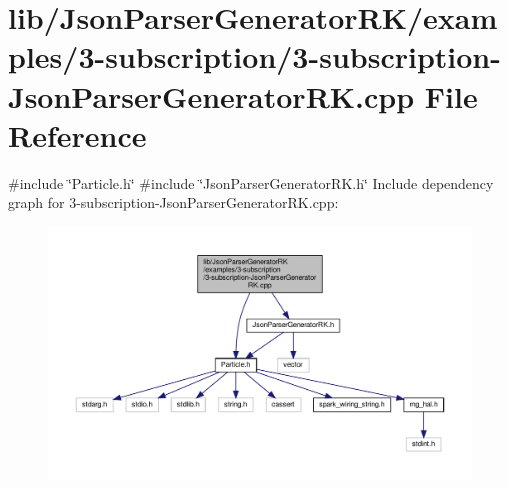 \hypertarget{3-subscription-_json_parser_generator_r_k_8cpp}{}\section{lib/\+Json\+Parser\+Generator\+R\+K/examples/3-\/subscription/3-\/subscription-\/\+Json\+Parser\+Generator\+RK.cpp File Reference}
\label{3-subscription-_json_parser_generator_r_k_8cpp}
{\ttfamily \#include \char`\"{}Particle.\+h\char`\"{}}\newline
{\ttfamily \#include \char`\"{}Json\+Parser\+Generator\+R\+K.\+h\char`\"{}}\newline
Include dependency graph for 3-\/subscription-\/\+Json\+Parser\+Generator\+RK.cpp\+:
\nopagebreak
\begin{figure}[H]
\begin{center}
\leavevmode
\includegraphics[width=350pt]{3-subscription-_json_parser_generator_r_k_8cpp__incl}
\end{center}
\end{figure}
